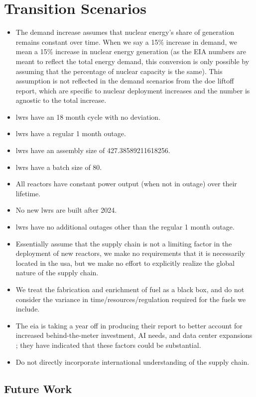 \section{Transition Scenarios}

\begin{itemize}
    \item The demand increase assumes that nuclear energy's share of generation remains constant over time. When we say a 15$\%$ increase in demand, we mean a 15$\%$ increase in nuclear energy generation (as the EIA numbers are meant to reflect the total energy demand, this conversion is only possible by assuming that the percentage of nuclear capacity is the same). This assumption is not reflected in the demand scenarios from the \gls{doe} liftoff report, which are specific to nuclear deployment increases and the number is agnostic to the total increase.
    \item \gls{lwr}s have an 18 month cycle with no deviation.
    \item \gls{lwr}s have a regular 1 month outage.
    \item \gls{lwr}s have an assembly size of 427.38589211618256.
    \item \gls{lwr}s have a batch size of 80.
    \item All reactors have constant power output (when not in outage) over their lifetime.
    \item No new \gls{lwr}s are built after 2024. %
    \item \gls{lwr}s have no additional outages other than the regular 1 month outage.
    \item Essentially assume that the supply chain is not a limiting factor in the deployment of new reactors, we make no requirements that it is necessarily located in the \gls{usa}, but we make no effort to explicitly realize the global nature of the supply chain.
    \item We treat the fabrication and enrichment of fuel as a black box, and do not consider the variance in time/resources/regulation required for the fuels we include.
\end{itemize}


\begin{itemize}
    \item The \gls{eia} is taking a year off in producing their report to better account for increased behind-the-meter investment, AI needs, and data center expansions \cite{eia_annual_outlook_canceled_2023}; they have indicated that these factors could be substantial.
    \item Do not directly incorporate international understanding of the supply chain.
\end{itemize}


\subsection{Future Work}
\label{sec:future_work}